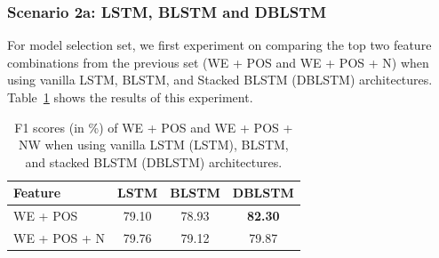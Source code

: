 %

\subsubsection{Scenario 2a: LSTM, BLSTM and DBLSTM}
For model selection set, we first experiment on comparing the top two feature combinations from the previous set (WE + POS and WE + POS + N) when using vanilla LSTM, BLSTM, and Stacked BLSTM (DBLSTM) architectures. Table~\ref{tab:modelselection1} shows the results of this experiment.

\begin{table}
	\caption{F1 scores (in \%) of WE + POS and WE + POS + NW when using vanilla LSTM (LSTM), BLSTM, and stacked BLSTM (DBLSTM) architectures.}
	\centering
	\label{tab:modelselection1}
	\begin{tabular}{lccc}
		\hline
		Feature & LSTM & BLSTM & DBLSTM \\
		\hline		\hline
		WE + POS & 79.10 & 78.93 & \textbf{82.30} \\
		WE + POS + N & 79.76 & 79.12 & 79.87 \\
		\hline
	\end{tabular}

\end{table}

